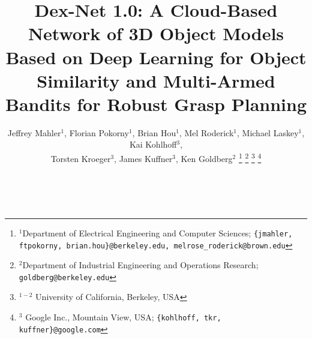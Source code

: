 \documentclass[letterpaper, 10 pt, conference]{ieeeconf}  %
\begin{document}
\title{\LARGE \bf Dex-Net 1.0: A Cloud-Based Network of 3D Object Models Based on Deep Learning for Object Similarity and Multi-Armed Bandits for Robust Grasp Planning
		}
\author{Jeffrey Mahler$^1$, Florian Pokorny$^1$, Brian Hou$^1$, Mel Roderick$^1$, Michael Laskey$^1$, Kai Kohlhoff$^3$, \\ Torsten Kroeger$^3$, James Kuffner$^3$, Ken Goldberg$^2$
\thanks{$^1$Department of Electrical Engineering and Computer Sciences; {\tt\small \{jmahler, ftpokorny, brian.hou\}@berkeley.edu, melrose\_roderick@brown.edu}}%
\thanks{$^2$Department of Industrial Engineering and Operations Research; {\tt\small goldberg@berkeley.edu}}%
\thanks{$^{1-2}$ University of California, Berkeley, USA}%
\thanks{$^3$ Google Inc., Mountain View, USA; {\tt\small \{kohlhoff, tkr, kuffner\}@google.com}}
}
\maketitle

 \\


%


%







%



\end{document}
